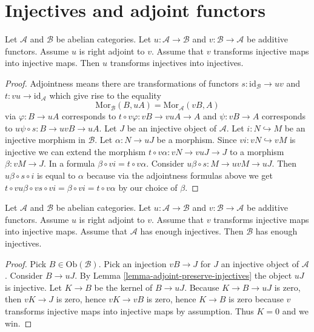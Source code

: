 \section{Injectives and adjoint functors}
\label{section-adjoint}

\begin{lemma}
\label{lemma-adjoint-preserve-injectives}
Let $\mathcal{A}$ and $\mathcal{B}$ be abelian categories.
Let $u : \mathcal{A} \to \mathcal{B}$ and
$v : \mathcal{B} \to \mathcal{A}$ be additive functors.
Assume $u$ is right adjoint to $v$.
Assume that $v$ transforms injective maps into injective maps.
Then $u$ transforms injectives into injectives.
\end{lemma}

\begin{proof}
Adjointness means there are transformations of functors
$s : \text{id}_{\mathcal{B}} \to uv$ and $t : vu \to \text{id}_{\mathcal{A}}$
which give rise to the equality
$$
\text{Mor}_{\mathcal{B}}(B, uA)
=
\text{Mor}_{\mathcal{A}}(vB, A)
$$
via $\varphi : B \to uA$ corresponds to
$t \circ v\varphi : vB \to vuA \to A$ and
$\psi : vB \to A$ corresponds to $u\psi \circ s : B \to uvB \to uA$.
Let $J$ be an injective object of $\mathcal{A}$.
Let $i : N \hookrightarrow M$ be an injective morphism
in $\mathcal{B}$. Let $\alpha : N \to uJ$ be a morphism.
Since $vi : vN \hookrightarrow vM$ is injective we can extend the morphism
$t \circ v\alpha : vN \to vuJ \to J$ to a morphism $\beta : vM \to J$.
In a formula $\beta \circ vi = t \circ v\alpha$.
Consider $u\beta \circ s : M \to uvM \to uJ$. Then
$u\beta \circ s \circ i$ is equal to $\alpha$ because
via the adjointness formulas above we get
$t \circ vu\beta \circ vs \circ vi = \beta \circ vi = t \circ v\alpha$
by our choice of $\beta$.
\end{proof}

\begin{lemma}
\label{lemma-adjoint-enough-injectives}
Let $\mathcal{A}$ and $\mathcal{B}$ be abelian categories.
Let $u : \mathcal{A} \to \mathcal{B}$ and
$v : \mathcal{B} \to \mathcal{A}$ be additive functors.
Assume $u$ is right adjoint to $v$.
Assume that $v$ transforms injective maps into injective maps.
Assume that $\mathcal{A}$ has enough injectives.
Then $\mathcal{B}$ has enough injectives.
\end{lemma}

\begin{proof}
Pick $B \in \text{Ob}(\mathcal{B})$.
Pick an injection $vB \to J$ for $J$
an injective object of $\mathcal{A}$.
Consider $B \to uJ$. By Lemma \ref{lemma-adjoint-preserve-injectives}
the object $uJ$ is injective. Let $K \to B$ be the
kernel of $B \to uJ$. Because
$K \to B \to uJ$ is zero, then
$vK \to J$ is zero, hence $vK \to vB$ is zero,
hence $K \to B$ is zero because $v$
transforms injective maps into injective maps
by assumption. Thus $K = 0$ and we win.
\end{proof}

